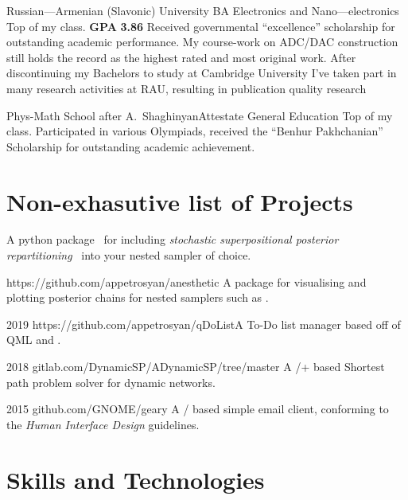 \documentclass{CurriculumVitae}[10pt, draft, condensed]
\begin{document}
{ {Russian---Armenian (Slavonic) University} {BA
  }{Electronics and Nano---electronics} {Top of my
  class. \textbf{GPA} \textbf{3.86} Received governmental
  ``excellence'' scholarship for outstanding academic performance. My
  course-work on ADC/DAC construction still holds the record as the
  highest rated and most original work. After discontinuing my
  Bachelors to study at Cambridge University I've taken part in many
  research activities at RAU, resulting in publication quality
  research~\cite{cu2o,measurement}}

 {Phys-Math School after
  A.~Shaghinyan}{Attestate }{General Education} {Top of my
  class. Participated in various Olympiads, received the ``Benhur
  Pakhchanian'' Scholarship for outstanding academic achievement. }

\section*{Non-exhasutive list of Projects}

 {A
  python package~\cite{sspr-joss} for including \emph{stochastic
    superpositional posterior repartitioning}~\cite{sspr} into your
  nested sampler of choice.}

 {https://github.com/appetrosyan/anesthetic}
{A package for visualising and plotting posterior chains for nested
  samplers such as .}

 {2019} {https://github.com/appetrosyan/qDoList}{A
  To-Do list manager based off of QML and .}

 {2018}
{gitlab.com/DynamicSP/ADynamicSP/tree/master} {A
  /+ based Shortest path problem solver for
  dynamic networks. }

 {2015} {github.com/GNOME/geary} {A
  / based simple email client, conforming to the
   \emph{Human Interface Design} guidelines.}



}

\section*{Skills and Technologies}
\end{document}
